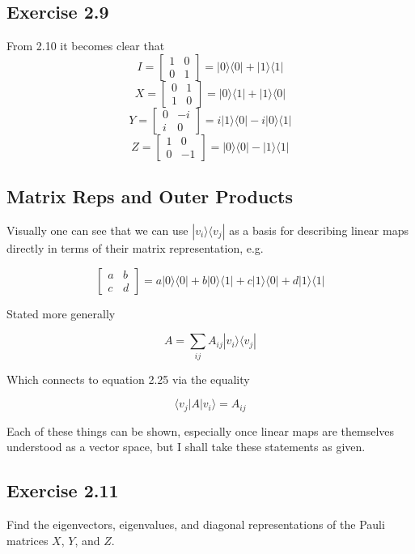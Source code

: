 \documentclass[]{article}
\begin{document}
\subsection{Exercise 2.9}

From 2.10 it becomes clear that
\[
I = \left[\begin{matrix}
1 & 0 \\
0 & 1
\end{matrix}\right] = |0\rangle\langle 0| + |1\rangle\langle 1|
\]
\[
X = \left[\begin{matrix}
0 & 1 \\
1 & 0
\end{matrix}\right] = |0\rangle\langle 1| + |1\rangle\langle 0|
\]
\[
Y = \left[\begin{matrix}
0 & -i \\
i & 0
\end{matrix}\right] = i|1\rangle\langle 0| -i|0\rangle\langle 1|
\]
\[
Z = \left[\begin{matrix}
1 & 0 \\
0 & -1
\end{matrix}\right] = |0\rangle\langle 0| - |1\rangle\langle 1|
\]

\subsection{Matrix Reps and Outer Products}

Visually one can see that we can use $|v_i\rangle \langle v_j|$ as a basis for describing linear maps directly in terms of their matrix representation, e.g.

\[\left[\begin{matrix}a&b\\c&d\end{matrix}\right] = a|0\rangle\langle 0| + b|0\rangle\langle 1| + c|1\rangle\langle 0| + d|1\rangle\langle 1|\]

Stated more generally

\[A = \sum_{ij} A_{ij}|v_i\rangle\langle v_j|\]

Which connects to equation 2.25 via the equality

\[\langle v_j| A | v_i\rangle = A_{ij}\]

Each of these things can be shown, especially once linear maps are themselves understood as a vector space, but I shall take these statements as given.

\subsection{Exercise 2.11}
Find the eigenvectors, eigenvalues, and diagonal representations of the Pauli matrices $X$, $Y$, and $Z$.
\end{document}
